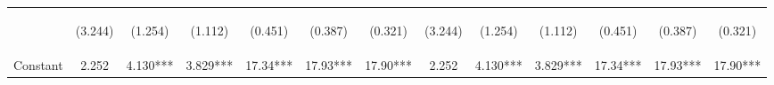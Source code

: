 \documentclass[]{article}
\begin{document}
\begin{center}
\begin{tabular}{lcccccccccccc}
\vspace{4pt} & \begin{footnotesize}(3.244)\end{footnotesize} & \begin{footnotesize}(1.254)\end{footnotesize} & \begin{footnotesize}(1.112)\end{footnotesize} & \begin{footnotesize}(0.451)\end{footnotesize} & \begin{footnotesize}(0.387)\end{footnotesize} & \begin{footnotesize}(0.321)\end{footnotesize} & \begin{footnotesize}(3.244)\end{footnotesize} & \begin{footnotesize}(1.254)\end{footnotesize} & \begin{footnotesize}(1.112)\end{footnotesize} & \begin{footnotesize}(0.451)\end{footnotesize} & \begin{footnotesize}(0.387)\end{footnotesize} & \begin{footnotesize}(0.321)\end{footnotesize} \\
Constant & 2.252 & 4.130*** & 3.829*** & 17.34*** & 17.93*** & 17.90*** & 2.252 & 4.130*** & 3.829*** & 17.34*** & 17.93*** & 17.90*** \\

\end{tabular}
\end{center}
\end{document}
